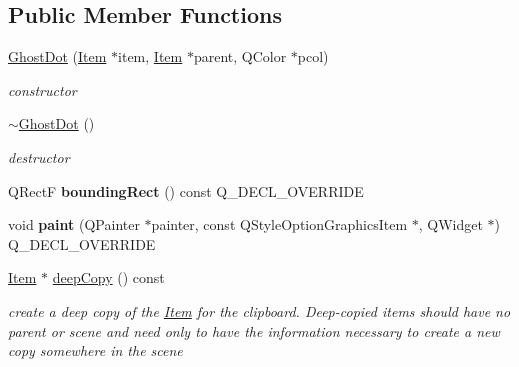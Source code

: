 \subsection*{Public Member Functions}
\begin{DoxyCompactItemize}
\item 
\hyperlink{classprim_1_1GhostDot_a39eceb1dc7b43a4b655850c6e951d18c}{Ghost\+Dot} (\hyperlink{classprim_1_1Item}{Item} $\ast$item, \hyperlink{classprim_1_1Item}{Item} $\ast$parent, Q\+Color $\ast$pcol)\hypertarget{classprim_1_1GhostDot_a39eceb1dc7b43a4b655850c6e951d18c}{}\label{classprim_1_1GhostDot_a39eceb1dc7b43a4b655850c6e951d18c}

\begin{DoxyCompactList}\small\item\em constructor \end{DoxyCompactList}\item 
\hyperlink{classprim_1_1GhostDot_adcf2798a87c26860e86e33b68569bcdb}{$\sim$\+Ghost\+Dot} ()\hypertarget{classprim_1_1GhostDot_adcf2798a87c26860e86e33b68569bcdb}{}\label{classprim_1_1GhostDot_adcf2798a87c26860e86e33b68569bcdb}

\begin{DoxyCompactList}\small\item\em destructor \end{DoxyCompactList}\item 
Q\+RectF {\bfseries bounding\+Rect} () const Q\+\_\+\+D\+E\+C\+L\+\_\+\+O\+V\+E\+R\+R\+I\+DE\hypertarget{classprim_1_1GhostDot_a5844a39b3e3d88d0e623f9fe1ceeb9b2}{}\label{classprim_1_1GhostDot_a5844a39b3e3d88d0e623f9fe1ceeb9b2}

\item 
void {\bfseries paint} (Q\+Painter $\ast$painter, const Q\+Style\+Option\+Graphics\+Item $\ast$, Q\+Widget $\ast$) Q\+\_\+\+D\+E\+C\+L\+\_\+\+O\+V\+E\+R\+R\+I\+DE\hypertarget{classprim_1_1GhostDot_a1dd50ebda0ec10345f11e57f3bd32e8a}{}\label{classprim_1_1GhostDot_a1dd50ebda0ec10345f11e57f3bd32e8a}

\item 
\hyperlink{classprim_1_1Item}{Item} $\ast$ \hyperlink{classprim_1_1GhostDot_a5c4aca3ca44cce6ace1f649b7b534d58}{deep\+Copy} () const \hypertarget{classprim_1_1GhostDot_a5c4aca3ca44cce6ace1f649b7b534d58}{}\label{classprim_1_1GhostDot_a5c4aca3ca44cce6ace1f649b7b534d58}

\begin{DoxyCompactList}\small\item\em create a deep copy of the \hyperlink{classprim_1_1Item}{Item} for the clipboard. Deep-\/copied items should have no parent or scene and need only to have the information necessary to create a new copy somewhere in the scene \end{DoxyCompactList}\end{DoxyCompactItemize}

